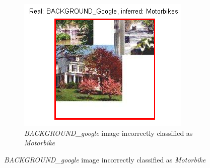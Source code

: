 \begin{figure}[htb]
	\centering
	\begin{subfigure}[t]{0.4\textwidth}
		\includegraphics[width=\textwidth]{./img/ex1/bg_google.png}
		\caption{\emph{BACKGROUND\_google} image incorrectly classified as \emph{Motorbike}}
	\end{subfigure}
	

\end{figure}
